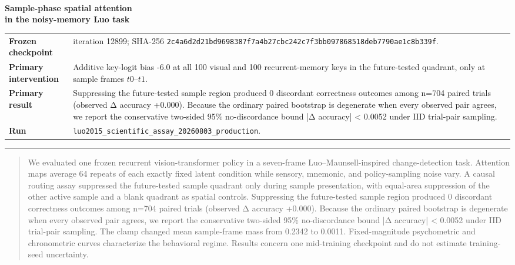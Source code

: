 \documentclass[10pt]{article}
\begin{document}
\begin{titlepage}
\thispagestyle{empty}\vspace*{10mm}{\color{Blue}\rule{\textwidth}{2.2pt}}\\[8mm]
{\fontsize{25}{30}\selectfont\bfseries Sample-phase spatial attention\\in the noisy-memory Luo task\par}
\vfill
\begin{tabularx}{\textwidth}{@{}p{4.0cm}X@{}}\toprule
\textbf{Frozen checkpoint} & iteration 12899; SHA-256 \texttt{2c4a6d2d21bd9698387f7a4b27cbc242c7f3bb097868518deb7790ae1c8b339f}.\\
\textbf{Primary intervention} & Additive key-logit bias -6.0 at all 100 visual and 100 recurrent-memory keys in the future-tested quadrant, only at sample frames $t0$--$t1$.\\
\textbf{Primary result} & Suppressing the future-tested sample region produced 0 discordant correctness outcomes among n=704 paired trials (observed Δ accuracy +0.000). Because the ordinary paired bootstrap is degenerate when every observed pair agrees, we report the conservative two-sided 95\% no-discordance bound |Δ accuracy| < 0.0052 under IID trial-pair sampling.\\
\textbf{Run} & \texttt{luo2015\_scientific\_assay\_20260803\_production}.\\\bottomrule
\end{tabularx}
\vfill{\color{Blue}\rule{\textwidth}{2.2pt}}
\end{titlepage}

\begin{abstract}
We evaluated one frozen recurrent vision-transformer policy in a seven-frame Luo--Maunsell-inspired change-detection task. Attention maps average 64 repeats of each exactly fixed latent condition while sensory, mnemonic, and policy-sampling noise vary. A causal routing assay suppressed the future-tested sample quadrant only during sample presentation, with equal-area suppression of the other active sample and a blank quadrant as spatial controls. Suppressing the future-tested sample region produced 0 discordant correctness outcomes among n=704 paired trials (observed Δ accuracy +0.000). Because the ordinary paired bootstrap is degenerate when every observed pair agrees, we report the conservative two-sided 95\% no-discordance bound |Δ accuracy| < 0.0052 under IID trial-pair sampling. The clamp changed mean sample-frame mass from 0.2342 to 0.0011. Fixed-magnitude psychometric and chronometric curves characterize the behavioral regime. Results concern one mid-training checkpoint and do not estimate training-seed uncertainty.
\end{abstract}
\end{document}
